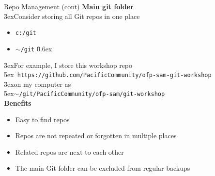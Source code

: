 \documentclass[aspectratio=169]{beamer}
\begin{document}

\begin{frame}{Repo Management (cont)}\small
  {\bf\darkgreen Main git folder}\\[1ex]
  \h{3ex}Consider storing all Git repos in one place\\[-0.5ex]
  \begin{itemize}\fns
    \item[] {\tt c:/git} \\[0ex]
    \item[] {\tt $\sim$/git} \h{0.6ex}
  \end{itemize}
  \h{3ex}For example, I store this workshop repo\\[0.5ex]
  \h{5ex}{\tt\fns
    https://github.com/PacificCommunity/ofp-sam-git-workshop}\\[0.5ex]
  \h{3ex}on my computer as\\
  \h{5ex}{\tt\fns $\sim$/git/PacificCommunity/ofp-sam/git-workshop}\\
  \vspace{2ex}
  {\bf\darkgreen Benefits}\\[-0.5ex]
  \begin{itemize}
    \item[] Easy to find repos\\[0ex]
    \item[] Repos are not repeated or forgotten in multiple places\\[0ex]
    \item[] Related repos are next to each other\\[0ex]
    \item[] The main Git folder can be excluded from regular backups
  \end{itemize}
\end{frame}



\end{document}
